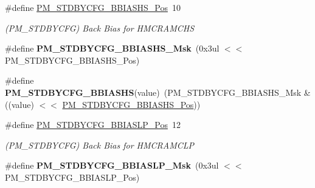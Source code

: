\begin{DoxyCompactItemize}
\item 
\hypertarget{group___s_a_m_l21___p_m_ga458435797446648ad5db899fbfb7b208}{}\#define \hyperlink{group___s_a_m_l21___p_m_ga458435797446648ad5db899fbfb7b208}{P\+M\+\_\+\+S\+T\+D\+B\+Y\+C\+F\+G\+\_\+\+B\+B\+I\+A\+S\+H\+S\+\_\+\+Pos}~10\label{group___s_a_m_l21___p_m_ga458435797446648ad5db899fbfb7b208}

\begin{DoxyCompactList}\small\item\em (P\+M\+\_\+\+S\+T\+D\+B\+Y\+C\+F\+G) Back Bias for H\+M\+C\+R\+A\+M\+C\+H\+S \end{DoxyCompactList}\item 
\hypertarget{group___s_a_m_l21___p_m_ga0023b1d332f3aa330f28e8cb58600a2d}{}\#define {\bfseries P\+M\+\_\+\+S\+T\+D\+B\+Y\+C\+F\+G\+\_\+\+B\+B\+I\+A\+S\+H\+S\+\_\+\+Msk}~(0x3ul $<$$<$ P\+M\+\_\+\+S\+T\+D\+B\+Y\+C\+F\+G\+\_\+\+B\+B\+I\+A\+S\+H\+S\+\_\+\+Pos)\label{group___s_a_m_l21___p_m_ga0023b1d332f3aa330f28e8cb58600a2d}

\item 
\hypertarget{group___s_a_m_l21___p_m_ga78ca21898814ac3b7fad4207b3e769f3}{}\#define {\bfseries P\+M\+\_\+\+S\+T\+D\+B\+Y\+C\+F\+G\+\_\+\+B\+B\+I\+A\+S\+H\+S}(value)~(P\+M\+\_\+\+S\+T\+D\+B\+Y\+C\+F\+G\+\_\+\+B\+B\+I\+A\+S\+H\+S\+\_\+\+Msk \& ((value) $<$$<$ \hyperlink{group___s_a_m_l21___p_m_ga458435797446648ad5db899fbfb7b208}{P\+M\+\_\+\+S\+T\+D\+B\+Y\+C\+F\+G\+\_\+\+B\+B\+I\+A\+S\+H\+S\+\_\+\+Pos}))\label{group___s_a_m_l21___p_m_ga78ca21898814ac3b7fad4207b3e769f3}

\item 
\hypertarget{group___s_a_m_l21___p_m_gabe11f170a994b64f6e1cffc5aac98129}{}\#define \hyperlink{group___s_a_m_l21___p_m_gabe11f170a994b64f6e1cffc5aac98129}{P\+M\+\_\+\+S\+T\+D\+B\+Y\+C\+F\+G\+\_\+\+B\+B\+I\+A\+S\+L\+P\+\_\+\+Pos}~12\label{group___s_a_m_l21___p_m_gabe11f170a994b64f6e1cffc5aac98129}

\begin{DoxyCompactList}\small\item\em (P\+M\+\_\+\+S\+T\+D\+B\+Y\+C\+F\+G) Back Bias for H\+M\+C\+R\+A\+M\+C\+L\+P \end{DoxyCompactList}\item 
\hypertarget{group___s_a_m_l21___p_m_ga38e531f4c3146c609d5c84e4f55a6e3a}{}\#define {\bfseries P\+M\+\_\+\+S\+T\+D\+B\+Y\+C\+F\+G\+\_\+\+B\+B\+I\+A\+S\+L\+P\+\_\+\+Msk}~(0x3ul $<$$<$ P\+M\+\_\+\+S\+T\+D\+B\+Y\+C\+F\+G\+\_\+\+B\+B\+I\+A\+S\+L\+P\+\_\+\+Pos)\label{group___s_a_m_l21___p_m_ga38e531f4c3146c609d5c84e4f55a6e3a}


\end{DoxyCompactItemize}
